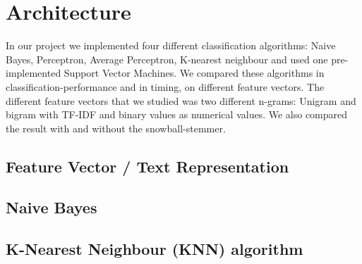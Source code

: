 \chapter{Architecture}
In our project we implemented four different classification algorithms: Naive Bayes, Perceptron, Average Perceptron, K-nearest neighbour and used one pre-implemented Support Vector Machines. 
We compared these algorithms in classification-performance and in timing, on different feature vectors.
The different feature vectors that we studied was two different n-grams: Unigram and bigram with TF-IDF and binary values as numerical values. We also compared the result with and without the snowball-stemmer.
\section{Feature Vector / Text Representation}

\section{Naive Bayes}


\section{K-Nearest Neighbour (KNN) algorithm}

